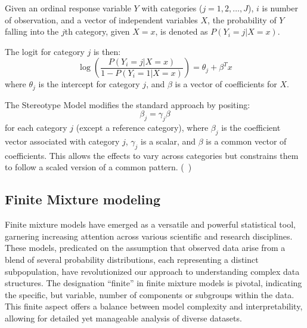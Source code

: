 \documentclass{article}
\begin{document}
Given an ordinal response variable $Y$ with categories ($j=1, 2, \ldots, J$), $i$ is number of observation, and a vector of independent variables $X$, the probability of $Y$ falling into the $j$th category, given $X = x$, is denoted as $P(Y_i = j | X = x)$.


The logit for category $j$ is then:
\[
\log\left(\frac{P(Y_i = j | X = x)}{1 - P(Y_i = 1 | X = x)}\right) = \theta_j + \beta^T x
\]
where $\theta_j$ is the intercept for category $j$, and $\beta$ is a vector of coefficients for $X$.

The Stereotype Model modifies the standard approach by positing:
\[
\beta_j = \gamma_j \beta
\]
for each category $j$ (except a reference category), where $\beta_j$ is the coefficient vector associated with category $j$, $\gamma_j$ is a scalar, 
and $\beta$ is a common vector of coefficients. This allows the effects to vary across categories but constrains them to follow a scaled version of a common pattern. (~\cite{anderson1984regression})


\subsection{Finite Mixture modeling}

Finite mixture models have emerged as a versatile and powerful statistical tool, garnering increasing attention across various scientific and research disciplines. These models, predicated on the assumption that observed data arise from a blend of several probability distributions, each representing a distinct subpopulation, have revolutionized our approach to understanding complex data structures. The designation ``finite'' in finite mixture models is pivotal, indicating the specific, but variable, number of components or subgroups within the data. This finite aspect offers a balance between model complexity and interpretability, allowing for detailed yet manageable analysis of diverse datasets.
\end{document}
